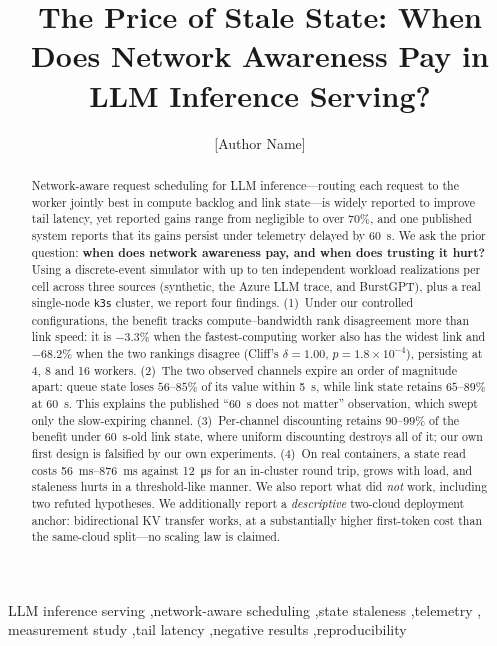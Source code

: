 \documentclass[preprint,12pt]{elsarticle}
\begin{document}
\begin{frontmatter}

\title{The Price of Stale State: When Does Network Awareness Pay in
       LLM Inference Serving?}

\author[inst1]{[Author Name]}
\address[inst1]{[Affiliation], [City], [Country]. [email@example.org]}

\begin{abstract}
Network-aware request scheduling for LLM inference---routing each request to the worker
jointly best in compute backlog and link state---is widely reported to improve tail latency, yet
reported gains range from negligible to over 70\%, and one published system reports that its gains
persist under telemetry delayed by \SI{60}{\second}. We ask the prior question: \textbf{when does
network awareness pay, and when does trusting it hurt?} Using a discrete-event simulator with up to
ten independent workload realizations per cell across three sources (synthetic, the Azure LLM
trace, and BurstGPT), plus a real single-node \texttt{k3s} cluster, we report four findings.
(1)~Under our controlled configurations, the benefit tracks compute--bandwidth rank
disagreement more than link speed: it is $-3.3\%$ when the
fastest-computing worker also has the widest link and $-68.2\%$ when the two rankings disagree
(Cliff's $\delta=1.00$, $p=1.8\times10^{-4}$), persisting at 4, 8 and 16 workers.
(2)~The two observed channels expire an order of magnitude apart: queue state loses $56$--$85\%$ of
its value within \SI{5}{\second}, while link state retains $65$--$89\%$ at \SI{60}{\second}. This
explains the published ``\SI{60}{\second} does not matter'' observation, which swept only the
slow-expiring channel. (3)~Per-channel discounting retains $90$--$99\%$ of the benefit under
\SI{60}{\second}-old link state, where uniform discounting destroys all of it; our own first
design is falsified by our own experiments. (4)~On real containers, a state read costs
\SIrange{56}{876}{\milli\second} against \SI{12}{\micro\second} for an in-cluster round trip,
grows with load, and staleness hurts in a threshold-like manner. We also report what did
\emph{not} work, including two refuted hypotheses. We additionally report a \emph{descriptive}
two-cloud deployment anchor: bidirectional KV transfer works, at a substantially higher
first-token cost than the same-cloud split---no scaling law is claimed.
\end{abstract}

\begin{keyword}
LLM inference serving \sep network-aware scheduling \sep state staleness \sep telemetry \sep
measurement study \sep tail latency \sep negative results \sep reproducibility
\end{keyword}

\end{frontmatter}
\end{document}
